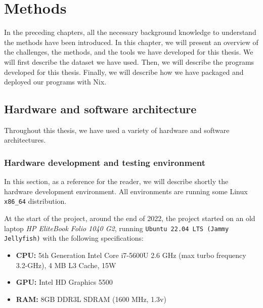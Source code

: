 \chapter{Methods}\label{chap:methods}


In the preceding chapters, all the necessary background knowledge to understand the methods have been introduced. In this chapter, we will present an overview of the challenges, the methods, and the tools we have developed for this thesis. We will first describe the dataset we have used. Then, we will describe the programs developed for this thesis. Finally, we will describe how we have packaged and deployed our programs with Nix.



\section{Hardware and software architecture}
    Throughout this thesis, we have used a variety of hardware and software architectures. 
    
    \subsection{Hardware development and testing environment}
    In this section, as a reference for the reader, we will describe shortly the hardware development environment. All environments are running some Linux \texttt{x86\_64} distribution.

    At the start of the project, around the end of 2022, the project started on an old laptop \textit{HP EliteBook Folio 1040 G2}, running \texttt{Ubuntu 22.04 LTS (Jammy Jellyfish)} with the following specifications:

    \begin{itemize}
        \item \textbf{CPU:} 5th Generation Intel Core i7-5600U 2.6 GHz (max turbo frequency 3.2-GHz), 4 MB L3 Cache, 15W
        \item \textbf{GPU:} Intel HD Graphics 5500
        \item \textbf{RAM:} 8GB DDR3L SDRAM (1600 MHz, 1.3v)
    \end{itemize}

